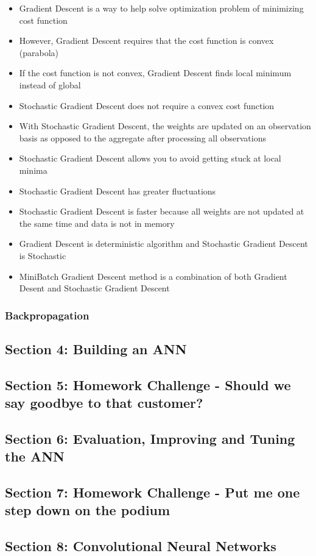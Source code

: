 \documentclass[11pt]{article}
\begin{document}
\begin{itemize}
\item Gradient Descent is a way to help solve optimization problem of minimizing cost function
\item However, Gradient Descent requires that the cost function is convex (parabola)
\item If the cost function is not convex, Gradient Descent finds local minimum instead of global
\item Stochastic Gradient Descent does not require a convex cost function
\item With Stochastic Gradient Descent, the weights are updated on an observation basis as opposed to the aggregate after processing all observations
\item Stochastic Gradient Descent allows you to avoid getting stuck at local minima
\item Stochastic Gradient Descent has greater fluctuations
\item Stochastic Gradient Descent is faster because all weights are not updated at the same time and data is not in memory
\item Gradient Descent is deterministic algorithm and Stochastic Gradient Descent is Stochastic
\item MiniBatch Gradient Descent method is a combination of both Gradient Desent and Stochastic Gradient Descent
\end{itemize}

\subsubsection{Backpropagation}
\label{sec:org5fbdb08}


\subsection{Section 4: Building an ANN}
\label{sec:org8590947}

\subsection{Section 5: Homework Challenge - Should we say goodbye to that customer?}
\label{sec:orgd4ac517}

\subsection{Section 6: Evaluation, Improving and Tuning the ANN}
\label{sec:orgc25a953}

\subsection{Section 7: Homework Challenge - Put me one step down on the podium}
\label{sec:org0f4123f}

\subsection{Section 8: Convolutional Neural Networks}
\label{sec:org2a47bda}
\end{document}
